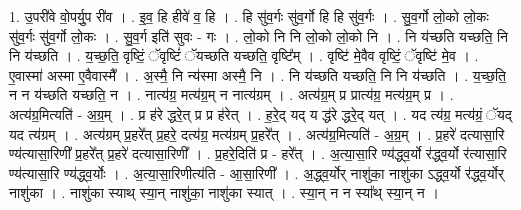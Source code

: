 \documentclass[17pt]{extarticle}
\begin{document}
1. उ॒परी॑वे वो॒पर्यु॒प री॑व । . इ॒व॒ हि हीवे॑ व॒ हि । . हि सु॑व॒र्गः सु॑व॒र्गो हि हि सु॑व॒र्गः । . सु॒व॒र्गो लो॒को लो॒कः सु॑व॒र्गः सु॑व॒र्गो लो॒कः । . सु॒व॒र्ग इति॑ सुवः - गः । . लो॒को नि नि लो॒को लो॒को नि । . नि य॑च्छति यच्छति॒ नि नि य॑च्छति । . य॒च्छ॒ति॒ वृष्टिं॒ ॅवृष्टिं॑ ॅयच्छति यच्छति॒ वृष्टि᳚म् । . वृष्टि॑ मे॒वैव वृष्टिं॒ ॅवृष्टि॑ मे॒व । . ए॒वास्मा॑ अस्मा ए॒वैवास्मै᳚ । . अ॒स्मै॒ नि न्य॑स्मा अस्मै॒ नि । . नि य॑च्छति यच्छति॒ नि नि य॑च्छति । . य॒च्छ॒ति॒ न न य॑च्छति यच्छति॒ न । . नात्य॑ग्र॒ मत्य॑ग्र॒म् न नात्य॑ग्रम् । . अत्य॑ग्र॒म् प्र प्रात्य॑ग्र॒ मत्य॑ग्र॒म् प्र । . अत्य॑ग्र॒मित्यति॑ - अ॒ग्र॒म् । . प्र ह॑रे द्धरे॒त् प्र प्र ह॑रेत् । . ह॒रे॒द् यद् य द्ध॑रे द्धरे॒द् यत् । . यद त्य॑ग्र॒ मत्य॑ग्रं॒ ॅयद् यद त्य॑ग्रम् । . अत्य॑ग्रम् प्र॒हरे᳚त् प्र॒हरे॒ दत्य॑ग्र॒ मत्य॑ग्रम् प्र॒हरे᳚त् । . अत्य॑ग्र॒मित्यति॑ - अ॒ग्र॒म् । . प्र॒हरे॑ दत्यासा॒रि ण्य॑त्यासा॒रिणी᳚ प्र॒हरे᳚त् प्र॒हरे॑ दत्यासा॒रिणी᳚ । . प्र॒हरे॒दिति॑ प्र - हरे᳚त् । . अ॒त्या॒सा॒रि ण्य॑द्ध्व॒र्यो र॑द्ध्व॒र्यो र॑त्यासा॒रि ण्य॑त्यासा॒रि ण्य॑द्ध्व॒र्योः । . अ॒त्या॒सा॒रिणीत्य॑ति - आ॒सा॒रिणी᳚ । . अ॒द्ध्व॒र्योर् नाशु॑का॒ नाशु॑का ऽद्ध्व॒र्यो र॑द्ध्व॒र्योर् नाशु॑का । . नाशु॑का स्याथ् स्या॒न् नाशु॑का॒ नाशु॑का स्यात् । . स्या॒न् न न स्या᳚थ् स्या॒न् न । \newline
\end{document}
